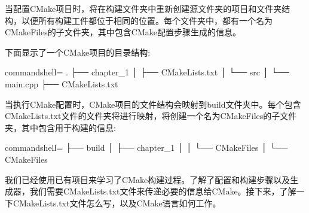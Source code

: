 当配置CMake项目时，将在构建文件夹中重新创建源文件夹的项目和文件夹结构，以便所有构建工件都位于相同的位置。每个文件夹中，都有一个名为CMakeFiles的子文件夹，其中包含CMake配置步骤生成的信息。

下面显示了一个CMake项目的目录结构:

\begin{tcblisting}{commandshell={}}
.
├── chapter_1
│      ├── CMakeLists.txt
│      └── src
│            └── main.cpp
├── CMakeLists.txt
\end{tcblisting}

当执行CMake配置时，CMake项目的文件结构会映射到build文件夹中。每个包含CMakeLists.txt文件的文件夹将进行映射，将创建一个名为CMakeFiles的子文件夹，其中包含用于构建的信息:

\begin{tcblisting}{commandshell={}}
├── build
│     ├── chapter_1
│     │      └── CMakeFiles
│     └── CMakeFiles
\end{tcblisting}

我们已经使用已有项目来学习了CMake构建过程。了解了配置和构建步骤以及生成器，我们需要CMakeLists.txt文件来传递必要的信息给CMake。接下来，了解一下CMakeLists.txt文件怎么写，以及CMake语言如何工作。























